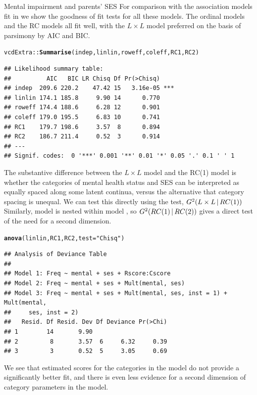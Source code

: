 \documentclass[11pt]{book}\usepackage[]{graphicx}\usepackage[]{color}
\makeatletter
\newcommand{\hlstr}[1]{\textcolor[rgb]{0.192,0.494,0.8}{#1}}%
\newcommand{\hlstd}[1]{\textcolor[rgb]{0.345,0.345,0.345}{#1}}%
\newcommand{\hlkwc}[1]{\textcolor[rgb]{0.333,0.667,0.333}{#1}}%
\newcommand{\hlkwd}[1]{\textcolor[rgb]{0.737,0.353,0.396}{\textbf{#1}}}%
\newenvironment{kframe}{%
 \def\at@end@of@kframe{}%
 \ifinner\ifhmode%
  \def\at@end@of@kframe{\end{minipage}}%
  \begin{minipage}{\columnwidth}%
 \fi\fi%
 \def\FrameCommand##1{\hskip\@totalleftmargin \hskip-\fboxsep
 \colorbox{shadecolor}{##1}\hskip-\fboxsep
     \hskip-\linewidth \hskip-\@totalleftmargin \hskip\columnwidth}%
 \MakeFramed {\advance\hsize-\width
   \@totalleftmargin\z@ \linewidth\hsize
   \@setminipage}}%
 {\par\unskip\endMakeFramed%
 \at@end@of@kframe}
\newenvironment{knitrout}{}{} %
\renewenvironment{knitrout}{\small\renewcommand{\baselinestretch}{.85}}{} %
\makeatother
\begin{document}
\begin{Example}[mental5]{Mental impairment and parents' SES}
For comparison with the \loglin association models fit in 
we show the \GSQ goodness of fit tests for all these models.
The ordinal \loglin models and the RC models all fit well, with the
$L \times L$ model preferred on the basis of parsimony by AIC and BIC.
\begin{knitrout}
\color{fgcolor}\begin{kframe}
\begin{alltt}
\hlstd{vcdExtra::}\hlkwd{Summarise}\hlstd{(indep, linlin, roweff, coleff, RC1, RC2)}
\end{alltt}
\begin{verbatim}
## Likelihood summary table:
##          AIC   BIC LR Chisq Df Pr(>Chisq)    
## indep  209.6 220.2    47.42 15   3.16e-05 ***
## linlin 174.1 185.8     9.90 14      0.770    
## roweff 174.4 188.6     6.28 12      0.901    
## coleff 179.0 195.5     6.83 10      0.741    
## RC1    179.7 198.6     3.57  8      0.894    
## RC2    186.7 211.4     0.52  3      0.914    
## ---
## Signif. codes:  0 '***' 0.001 '**' 0.01 '*' 0.05 '.' 0.1 ' ' 1
\end{verbatim}
\end{kframe}
\end{knitrout}
The substantive difference between the $L \times L$ model and the RC(1)
model is whether the categories of mental health status and SES can be
interpreted as equally spaced along some latent continua, versus the
alternative that category spacing is unequal.
We can test this directly using the \LR test, $G^2(L \times L \, | \, RC(1))$
Similarly, model  is nested within model ,
so $G^2(RC(1) \, | \, RC(2))$ gives a direct test of the need for a second
dimension.
\begin{knitrout}
\color{fgcolor}\begin{kframe}
\begin{alltt}
\hlkwd{anova}\hlstd{(linlin, RC1, RC2,} \hlkwc{test}\hlstd{=}\hlstr{"Chisq"}\hlstd{)}
\end{alltt}
\begin{verbatim}
## Analysis of Deviance Table
## 
## Model 1: Freq ~ mental + ses + Rscore:Cscore
## Model 2: Freq ~ mental + ses + Mult(mental, ses)
## Model 3: Freq ~ mental + ses + Mult(mental, ses, inst = 1) + Mult(mental, 
##     ses, inst = 2)
##   Resid. Df Resid. Dev Df Deviance Pr(>Chi)
## 1        14       9.90                     
## 2         8       3.57  6     6.32     0.39
## 3         3       0.52  5     3.05     0.69
\end{verbatim}
\end{kframe}
\end{knitrout}
We see that estimated scores for the categories in the model 
do not provide a significantly better fit, and there is even less evidence
for a second dimension of category parameters in the  model.


\end{Example}
\end{document}
